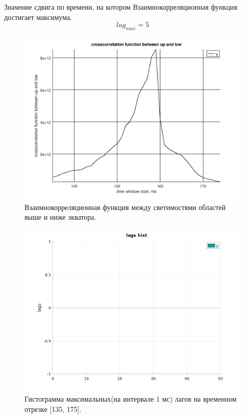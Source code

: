 \documentclass[12pt]{article}
\begin{document}
Значение сдвига по времени, на котором Взаимнокорреляционная функция \cite{wiki} достигает максимума.
$$ lag_{max} = 5 $$

\begin{figure}[H]
\caption{Взаимнокорреляционная функция между светимостями областей выше и ниже экватора.}
\begin{center}
\includegraphics[scale = 0.6]{plot6.png} 
\end{center}
\end{figure}

\begin{figure}[H]
\caption{Гистограмма максимальных(на интервале 1 мс) лагов на временном отрезке [135, 175].}
\begin{center}
\includegraphics[scale = 0.7]{plot8.png} 
\end{center}
\end{figure}
\end{document}
